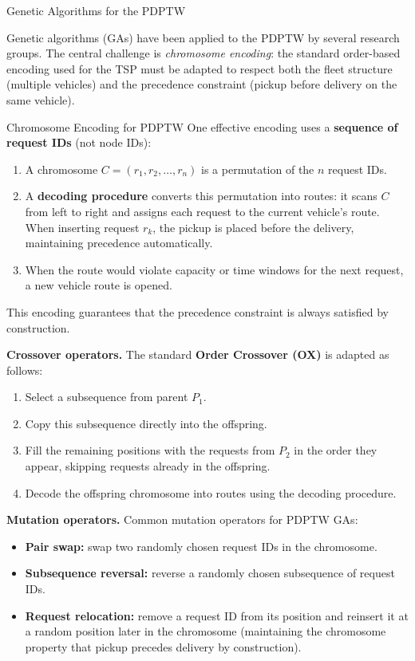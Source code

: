 \documentclass[aspectratio=169,10pt]{beamer}
\begin{document}
\begin{frame}[allowframebreaks]{Genetic Algorithms for the PDPTW}

  Genetic algorithms (GAs) have been applied to the PDPTW by several research groups.
  The central challenge is \emph{chromosome encoding}: the standard order-based encoding
  used for the TSP must be adapted to respect both the fleet structure (multiple vehicles)
  and the precedence constraint (pickup before delivery on the same vehicle).

  \begin{block}{Chromosome Encoding for PDPTW}
    One effective encoding uses a \textbf{sequence of request IDs} (not node IDs):
    \begin{enumerate}
      \item A chromosome $C = (r_1, r_2, \ldots, r_n)$ is a permutation of the $n$
            request IDs.
      \item A \textbf{decoding procedure} converts this permutation into routes:
            it scans $C$ from left to right and assigns each request to the current
            vehicle's route. When inserting request $r_k$, the pickup is placed before
            the delivery, maintaining precedence automatically.
      \item When the route would violate capacity or time windows for the next request,
            a new vehicle route is opened.
    \end{enumerate}
    This encoding guarantees that the precedence constraint is always satisfied by construction.
  \end{block}

  \textbf{Crossover operators.} The standard \textbf{Order Crossover (OX)} is adapted as follows:
  \begin{enumerate}
    \item Select a subsequence from parent $P_1$.
    \item Copy this subsequence directly into the offspring.
    \item Fill the remaining positions with the requests from $P_2$ in the order they appear,
          skipping requests already in the offspring.
    \item Decode the offspring chromosome into routes using the decoding procedure.
  \end{enumerate}

  \framebreak

  \textbf{Mutation operators.} Common mutation operators for PDPTW GAs:
  \begin{itemize}
    \item \textbf{Pair swap:} swap two randomly chosen request IDs in the chromosome.
    \item \textbf{Subsequence reversal:} reverse a randomly chosen subsequence of request IDs.
    \item \textbf{Request relocation:} remove a request ID from its position and reinsert
          it at a random position later in the chromosome (maintaining the chromosome
          property that pickup precedes delivery by construction).
  \end{itemize}


\end{frame}
\end{document}
